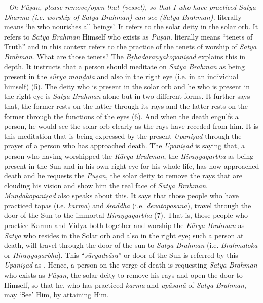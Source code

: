- \emph{Oh Pūṣan, please remove/open that (vessel), so that I who have practiced Satya Dharma (i.e. worship of Satya Brahman) can see (Satya Brahman).}  literally means `he who nourishes all beings'. It refers to the solar deity in the solar orb. It refers to \emph{Satya Brahman} Himself who exists as \emph{Pūṣan}.  literally means ``tenets of Truth'' and in this context refers to the practice of the tenets of worship of \emph{Satya Brahman}. What are those tenets? The \emph{Bṛhadāraṇyakopaniṣad} explains this in depth. It instructs that a person should meditate on \emph{Satya Brahman} as being present in the \emph{sūrya maṇḍala} and also in the right eye (i.e. in an individual himself) (5). The deity who is present in the solar orb and he who is present in the right eye is \emph{Satya Brahman} alone but in two different forms. It further says that, the former rests on the latter through its rays and the latter rests on the former through the functions of the eyes (6). And when the death engulfs a person, he would see the solar orb clearly as the rays have receded from him. It is this meditation that is being expressed by the present \emph{Upaniṣad} through the prayer of a person who has approached death. The \emph{Upaniṣad} is saying that, a person who having worshipped the \emph{Kārya Brahman}, the \emph{Hiraṇyagarbha} as being present in the Sun and in his own right eye for his whole life, has now approached death and he requests the \emph{Pūṣan}, the solar deity to remove the rays that are clouding his vision and show him the real face of \emph{Satya Brahman}. \emph{Muṇḍakopaniṣad} also speaks about this. It says that those people who have practiced tapas (i.e. \emph{karma}) and \emph{śraddhā} (i.e. \emph{devatopāsana}), travel through the door of the Sun to the immortal \emph{Hiraṇyagarbha} (7). That is, those people who practice Karma and Vidya both together and worship the \emph{Kārya Brahman} as \emph{Satya} who resides in the Solar orb and also in the right eye; such a person at death, will travel through the door of the sun to \emph{Satya Brahman} (i.e. \emph{Brahmaloka} or \emph{Hiraṇyagarbha}). This ``\emph{sūryadvāra}'' or door of the Sun is referred by this \emph{Upaniṣad} as . Hence, a person on the verge of death is requesting \emph{Satya Brahman} who exists as \emph{Pūṣan}, the solar deity to remove his rays and open the door to Himself, so that he, who has practiced \emph{karma} and \emph{upāsanā} of \emph{Satya Brahman}, may `See' Him, by attaining Him.

